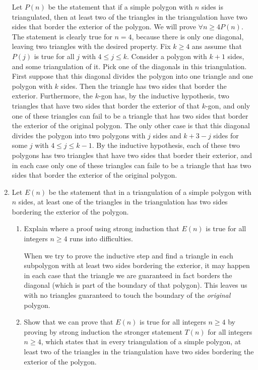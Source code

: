 \documentclass[11pt]{article}
\begin{document}
\begin{enumerate}[label=\textbf{\arabic*.}]
	Let $P(n)$ be the statement that if a simple polygon with $n$ sides is triangulated, then at least two of the triangles in the triangulation have two sides that border the exterior of the polygon. We will prove $\forall n \geq 4P(n)$. The statement is clearly true for $n = 4$, because there is only one diagonal, leaving two triangles with the desired property. Fix $k \geq 4$ ans assume that $P(j)$ is true for all $j$ with $4 \leq j \leq k$. Consider a polygon with $k + 1$ sides, and some triangulation of it. Pick one of the diagonals in this triangulation. First suppose that this diagonal divides the polygon into one triangle and one polygon with $k$ sides. Then the triangle has two sides that border the exterior. Furthermore, the $k$-gon has, by the inductive hypothesis, two triangles that have two sides that border the exterior of that $k$-gon, and only one of these triangles can fail to be a triangle that has two sides that border the exterior of the original polygon. The only other case is that this diagonal divides the polygon into two polygons with $j$ sides and $k + 3 - j$ sides for some $j$ with $4 \leq j \leq k - 1$. By the inductive hypothesis, each of these two polygons has two triangles that have two sides that border their exterior, and in each case only one of these triangles can faile to be a triangle that has two sides that border the exterior of the original polygon.
	
	\item Let $E(n)$ be the statement that in a triangulation of a simple polygon with $n$ sides, at least one of the triangles in the triangulation has two sides bordering the exterior of the polygon.
	
	\begin{enumerate}[label=\textbf{\alph*)}]
		\item Explain where a proof using strong induction that $E(n)$ is true for all integers $n \geq 4$ runs into difficulties.
		
		When we try to prove the inductive step and find a triangle in each subpolygon with at least two sides bordering the exterior, it may happen in each case that the triangle we are guaranteed in fact borders the diagonal (which is part of the boundary of that polygon). This leaves us with no triangles guaranteed to touch the boundary of the \emph{original} polygon.
		
		\item Show that we can prove that $E(n)$ is true for all integers $n \geq 4$ by proving by strong induction the stronger statement $T(n)$ for all integers $n \geq 4$, which states that in every triangulation of a simple polygon, at least two of the triangles in the triangulation have two sides bordering the exterior of the polygon.
		

\end{enumerate}
\end{enumerate}
\end{document}
